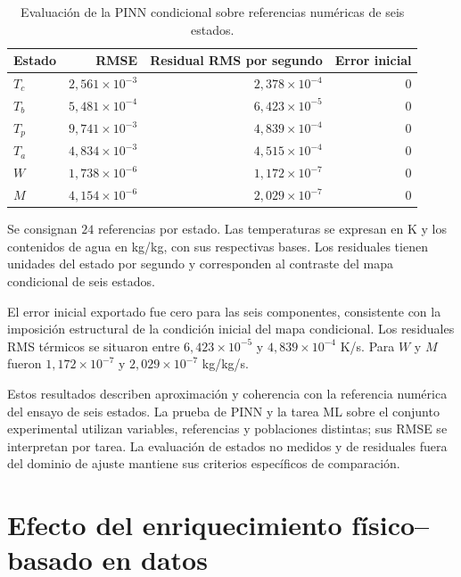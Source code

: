 \begin{table}[htbp]
\centering
\caption{Evaluación de la PINN condicional sobre referencias numéricas de seis estados.}
\label{tab:res_pinn}
\small
\setlength{\tabcolsep}{5pt}
\begin{tabular}{lrrr}
\toprule
Estado & RMSE & Residual RMS por segundo & Error inicial \\
\midrule
$T_c$ & $2{,}561\times10^{-3}$ & $2{,}378\times10^{-4}$ & $0$ \\
$T_b$ & $5{,}481\times10^{-4}$ & $6{,}423\times10^{-5}$ & $0$ \\
$T_p$ & $9{,}741\times10^{-3}$ & $4{,}839\times10^{-4}$ & $0$ \\
$T_a$ & $4{,}834\times10^{-3}$ & $4{,}515\times10^{-4}$ & $0$ \\
$W$ & $1{,}738\times10^{-6}$ & $1{,}172\times10^{-7}$ & $0$ \\
$M$ & $4{,}154\times10^{-6}$ & $2{,}029\times10^{-7}$ & $0$ \\
\bottomrule
\end{tabular}
\par\vspace{3pt}
\begin{minipage}{0.98\textwidth}\footnotesize
Se consignan $24$ referencias por estado. Las temperaturas se expresan en K y los contenidos de agua en kg/kg, con sus respectivas bases. Los residuales tienen unidades del estado por segundo y corresponden al contraste del mapa condicional de seis estados.
\end{minipage}
\end{table}


El error inicial exportado fue cero para las seis componentes, consistente con la imposición estructural de la condición inicial del mapa condicional. Los residuales RMS térmicos se situaron entre $6{,}423\times10^{-5}$ y $4{,}839\times10^{-4}$ K/s. Para $W$ y $M$ fueron $1{,}172\times10^{-7}$ y $2{,}029\times10^{-7}$ kg/kg/s.

Estos resultados describen aproximación y coherencia con la referencia numérica del ensayo de seis estados. La prueba de PINN y la tarea ML sobre el conjunto experimental utilizan variables, referencias y poblaciones distintas; sus RMSE se interpretan por tarea. La evaluación de estados no medidos y de residuales fuera del dominio de ajuste mantiene sus criterios específicos de comparación.

\FloatBarrier

\section{Efecto del enriquecimiento físico--basado en datos}
\label{res:enriquecimiento}

